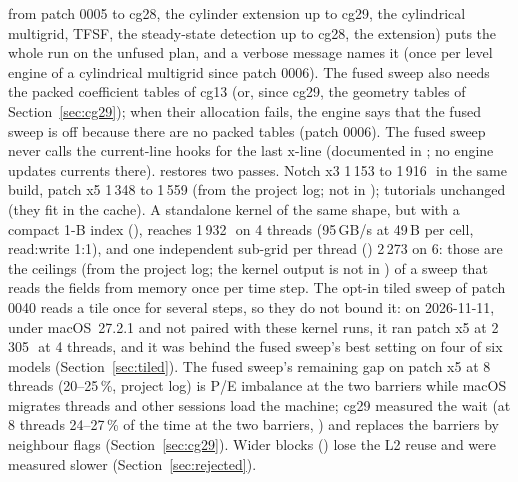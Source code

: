 from patch 0005 to cg28, the cylinder extension up to cg29, the cylindrical multigrid,
TFSF, the steady-state detection up to cg28, the  extension) puts the whole run on the unfused
plan, and a verbose message names it (once per level engine of a cylindrical multigrid since patch 0006). The fused
sweep also needs the packed coefficient tables of cg13 (or, since cg29, the geometry tables of
Section~\ref{sec:cg29}); when their allocation fails, the engine says that the fused sweep is off
because there are no packed tables (patch 0006). The fused sweep never calls the current-line hooks for the last
x-line (documented in ; no engine updates currents there).  restores
two passes. Notch x3 1\,153 to 1\,916\,\MC\ in the same build, patch x5 1\,348 to 1\,559 (from the project log; not in
); tutorials unchanged (they fit in the cache). A standalone kernel of the same shape, but with a
compact 1-B index (), reaches 1\,932\,\MC\ on 4 threads (95\,GB/s at 49\,B per cell,
read:write 1:1), and one independent sub-grid per thread () 2\,273 on 6: those are the ceilings (from
the project log; the kernel output is not in ) of a sweep that reads the fields from memory once per
time step. The opt-in tiled sweep of patch 0040 reads a tile once for several steps, so they do not bound it: on
2026-11-11, under macOS~27.2.1 and not paired with these kernel runs, it ran patch x5 at 2\,305\,\MC\ at 4 threads,
and it was behind the fused sweep's best setting on four of six models (Section~\ref{sec:tiled}). The fused sweep's
remaining gap on patch x5 at 8 threads (20--25\,\%, project log) is P/E imbalance at the two barriers while macOS migrates threads and other sessions load the machine;
cg29 measured the wait (at 8 threads 24--27\,\% of the time at the two barriers, ) and
replaces the barriers by neighbour flags (Section~\ref{sec:cg29}). Wider blocks () lose
the L2 reuse and were measured slower (Section~\ref{sec:rejected}).

